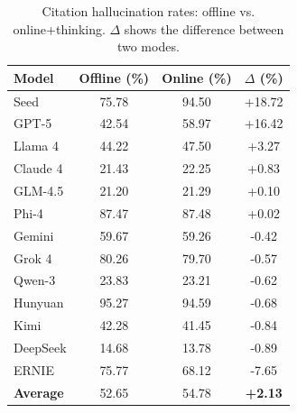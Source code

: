 
\begin{table}[t]
\centering
\caption{Citation hallucination rates: offline vs. online+thinking. $\Delta$ shows the difference between two modes.}
\label{tab:online_impact}
\small
{}
\begin{tabular}{lccc}
\toprule
\textbf{Model} & \cellcolor{red!12}\textbf{Offline (\%)} & \cellcolor{red!12}\textbf{Online (\%)} & \textbf{$\Delta$ (\%)} \\
\midrule
Seed & \cellcolor{red!30}75.78 & \cellcolor{red!34}94.50 & \cellcolor{red!18}+18.72 \\
GPT-5 & \cellcolor{red!20}42.54 & \cellcolor{red!24}58.97 & \cellcolor{red!16}+16.42 \\
Llama 4 & \cellcolor{red!20}44.22 & \cellcolor{red!20}47.50 & \cellcolor{red!10}+3.27 \\
Claude 4 & \cellcolor{red!12}21.43 & \cellcolor{red!12}22.25 & \cellcolor{red!8}+0.83 \\
GLM-4.5 & \cellcolor{red!12}21.20 & \cellcolor{red!12}21.29 & \cellcolor{red!6}+0.10 \\
Phi-4 & \cellcolor{red!34}87.47 & \cellcolor{red!34}87.48 & \cellcolor{red!6}+0.02 \\
Gemini & \cellcolor{red!24}59.67 & \cellcolor{red!24}59.26 & \cellcolor{green!6}-0.42 \\
Grok 4 & \cellcolor{red!30}80.26 & \cellcolor{red!30}79.70 & \cellcolor{green!6}-0.57 \\
Qwen-3 & \cellcolor{red!12}23.83 & \cellcolor{red!12}23.21 & \cellcolor{green!6}-0.62 \\
Hunyuan & \cellcolor{red!34}95.27 & \cellcolor{red!34}94.59 & \cellcolor{green!6}-0.68 \\
Kimi & \cellcolor{red!20}42.28 & \cellcolor{red!20}41.45 & \cellcolor{green!8}-0.84 \\
DeepSeek & \cellcolor{red!10}14.68 & \cellcolor{red!10}13.78 & \cellcolor{green!8}-0.89 \\
ERNIE & \cellcolor{red!30}75.77 & \cellcolor{red!28}68.12 & \cellcolor{green!10}-7.65 \\
\midrule
\textbf{Average} & \cellcolor{red!22}52.65 & \cellcolor{red!24}54.78 & \cellcolor{red!10}\textbf{+2.13} \\
\bottomrule
\end{tabular}
\end{table}

